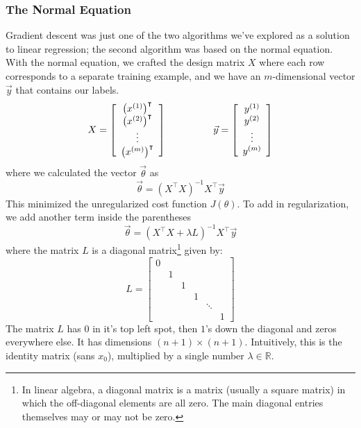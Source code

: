 \subsubsection{The Normal Equation}
Gradient descent was just one of the two algorithms we've explored as a solution to linear regression; the second algorithm was based on the normal equation. With the normal equation, we crafted the design matrix $X$ where each row corresponds to a separate training example, and we have an $m$-dimensional vector $\vec{y}$ that contains our labels. 
$$
X = \left[\begin{array}{c}
\left(x^{(1)}\right)^\intercal \\ \left(x^{(2)}\right)^\intercal \\ \vdots \\ \left(x^{(m)}\right)^\intercal
\end{array}\right] ~~\mbox{ \;\;\;\;\;\;\;\;\;\; }~~ \vec{y} = \left[\begin{array}{c} y^{(1)} \\ y^{(2)} \\ \vdots \\ y^{(m)} \end{array}\right]
$$
where we calculated the vector $\vec{\theta}$ as 
$$
\vec{\theta} = \left( X^\intercal X\right)^{-1} X^\intercal \vec{y}
$$
This minimized the unregularized cost function $J\left(\theta\right)$. To add in regularization, we add another term inside the parentheses
\begin{equation}
\vec{\theta} = \left( X^\intercal X + \lambda L \right)^{-1} X^\intercal \vec{y}
\end{equation}
where the matrix $L$ is a diagonal matrix\footnote{In linear algebra, a diagonal matrix is a matrix (usually a square matrix) in which the off-diagonal elements are all zero. The main diagonal entries themselves may or may not be zero.} given by:
\begin{equation}
L = \left[\begin{array}{cccccc}
0 &  &  &  &  &  \\
 & 1 & & & & \\
& & 1 & & & \\
& & & 1 & & \\
& & & & \ddots & \\
& & & & & 1
\end{array}\right]
\end{equation}
The matrix $L$ has $0$ in it's top left spot, then $1$'s down the diagonal and zeros everywhere else. It has dimensions $\left(n+1\right) \times \left(n+1\right)$. Intuitively, this is the identity matrix (sans $x_0$), multiplied by a single number $\lambda \in \mathbb{R}$.

